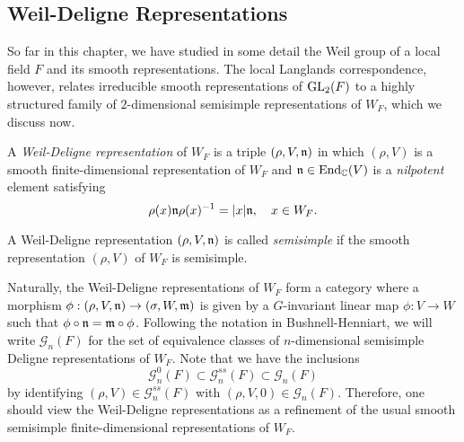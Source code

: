\subsection{Weil-Deligne Representations}
So far in this chapter, we have studied in some detail the Weil group of a local field $F$ and its smooth representations. The local Langlands correspondence, however, relates irreducible smooth representations of $\mathrm{GL}_2(F)$ to a highly structured family of $2$-dimensional semisimple representations of $W_F$, which we discuss now.

\begin{defn}\label{defn:WeilDeligne}
    A \textit{Weil-Deligne representation} of $W_F$ is a triple $(\rho,V,\mathfrak{n})$ in which $(\rho,V)$ is a smooth finite-dimensional representation of $W_F$ and $\mathfrak{n}\in\mathrm{End}_{\mathbb{C}}(V)$ is a \textit{nilpotent} element satisfying
    $$\rho(x)\mathfrak{n}\rho(x)^{-1}=|x|\mathfrak{n},\quad x\in W_F.$$

    A Weil-Deligne representation $(\rho,V,\mathfrak{n})$ is called \textit{semisimple} if the smooth representation $(\rho,V)$ of $W_F$ is semisimple.
\end{defn}

Naturally, the Weil-Deligne representations of $W_F$ form a category where a morphism $\phi:(\rho,V,\mathfrak{n})\to(\sigma,W,\mathfrak{m})$ is given by a $G$-invariant linear map $\phi:V\to W$ such that $\phi\circ\mathfrak{n}=\mathfrak{m}\circ\phi$. Following the notation in Bushnell-Henniart, we will write $\mathcal{G}_n(F)$ for the set of equivalence classes of $n$-dimensional semisimple Deligne representations of $W_F$. Note that we have the inclusions
$$\mathcal{G}^{0}_n(F)\subset\mathcal{G}_n^{ss}(F)\subset\mathcal{G}_n(F)$$
by identifying $(\rho,V)\in\mathcal{G}_n^{ss}(F)$ with $(\rho,V,0)\in\mathcal{G}_n(F)$. Therefore, one should view the Weil-Deligne representations as a refinement of the usual smooth semisimple finite-dimensional representations of $W_F$. 

